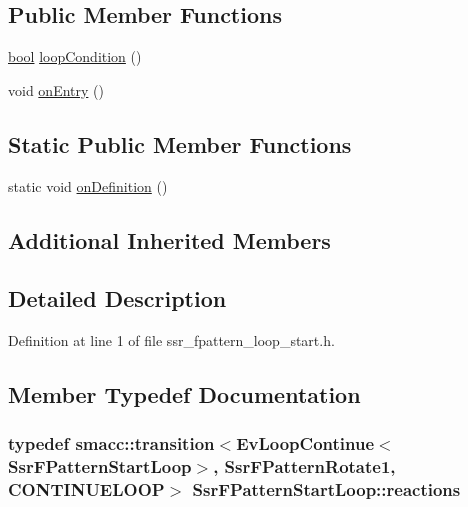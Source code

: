 \subsection*{Public Member Functions}
\begin{DoxyCompactItemize}
\item 
\hyperlink{classbool}{bool} \hyperlink{structSsrFPatternStartLoop_a990075c43854e419831b1d9b0e8fed06}{loop\+Condition} ()
\item 
void \hyperlink{structSsrFPatternStartLoop_a03c8e22081b280dde05b22ebf707eb30}{on\+Entry} ()
\end{DoxyCompactItemize}
\subsection*{Static Public Member Functions}
\begin{DoxyCompactItemize}
\item 
static void \hyperlink{structSsrFPatternStartLoop_aec64b36b1a0cc9a9449ad4cbc648f4d2}{on\+Definition} ()
\end{DoxyCompactItemize}
\subsection*{Additional Inherited Members}


\subsection{Detailed Description}


Definition at line 1 of file ssr\+\_\+fpattern\+\_\+loop\+\_\+start.\+h.



\subsection{Member Typedef Documentation}
\subsubsection[{\texorpdfstring{reactions}{reactions}}]{\setlength{\rightskip}{0pt plus 5cm}typedef {\bf smacc\+::transition}$<$Ev\+Loop\+Continue$<${\bf Ssr\+F\+Pattern\+Start\+Loop}$>$, {\bf Ssr\+F\+Pattern\+Rotate1}, C\+O\+N\+T\+I\+N\+U\+E\+L\+O\+OP$>$ {\bf Ssr\+F\+Pattern\+Start\+Loop\+::reactions}}\hypertarget{structSsrFPatternStartLoop_aac85f43e96a9f790df66bf07d1dffc75}{}\label{structSsrFPatternStartLoop_aac85f43e96a9f790df66bf07d1dffc75}


